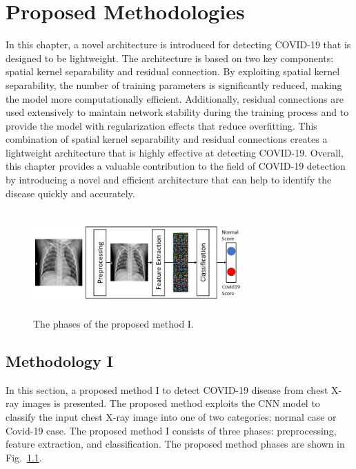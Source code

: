 
\chapter{Proposed Methodologies} %

\label{chp:proposed1} %
In this chapter, a novel architecture is introduced for detecting COVID-19 that is designed to be lightweight. The architecture is based on two key components: spatial kernel separability and residual connection. By exploiting spatial kernel separability, the number of training parameters is significantly reduced, making the model more computationally efficient. Additionally, residual connections are used extensively to maintain network stability during the training process and to provide the model with regularization effects that reduce overfitting. This combination of spatial kernel separability and residual connections creates a lightweight architecture that is highly effective at detecting COVID-19. Overall, this chapter provides a valuable contribution to the field of COVID-19 detection by introducing a novel and efficient architecture that can help to identify the disease quickly and accurately. 

\begin{figure}[th]
    \centering
    \includegraphics[height=40mm,width=8.0cm]{Figures/fig1.jpg}
    \caption{The phases of the proposed method I.}
    \label{fig1}
    \end{figure}

\section{Methodology I}
In this section, a  proposed method I to detect COVID-19 disease from chest X-ray images is presented. The proposed method exploits the CNN model to classify the input chest X-ray image into one of two categories; normal case or Covid-19 case. The proposed method I consists of three phases: preprocessing, feature extraction, and classification. The proposed method phases are shown in Fig.~\ref{fig1}. 

